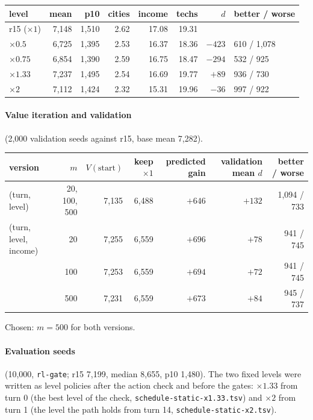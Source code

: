 \documentclass{../polyexp}
\begin{document}
\begin{center}\small
\begin{tabular}{lrrrrrrl}
\toprule
level & mean & p10 & cities & income & techs & $d$ & better / worse \\
\midrule
r15 ($\times1$) & 7{,}148 & 1{,}510 & 2.62 & 17.08 & 19.31 &        & \\
$\times0.5$     & 6{,}725 & 1{,}395 & 2.53 & 16.37 & 18.36 & $-423$ & 610 / 1{,}078 \\
$\times0.75$    & 6{,}854 & 1{,}390 & 2.59 & 16.75 & 18.47 & $-294$ & 532 / 925 \\
$\times1.33$    & 7{,}237 & 1{,}495 & 2.54 & 16.69 & 19.77 & $+89$  & 936 / 730 \\
$\times2$       & 7{,}112 & 1{,}424 & 2.32 & 15.31 & 19.96 & $-36$  & 997 / 922 \\
\bottomrule
\end{tabular}
\end{center}

\paragraph{Value iteration and validation} (2{,}000 validation seeds against r15, base mean 7{,}282).

\begin{center}\small
\begin{tabular}{lrrrrrr}
\toprule
version & $m$ & $V(\text{start})$ & keep $\times1$ & predicted gain & validation mean $d$ & better / worse \\
\midrule
(turn, level)          & 20, 100, 500 & 7{,}135 & 6{,}488 & $+646$ & $+132$ & 1{,}094 / 733 \\
(turn, level, income)  & 20           & 7{,}255 & 6{,}559 & $+696$ & $+78$  & 941 / 745 \\
                       & 100          & 7{,}253 & 6{,}559 & $+694$ & $+72$  & 941 / 745 \\
                       & 500          & 7{,}231 & 6{,}559 & $+673$ & $+84$  & 945 / 737 \\
\bottomrule
\end{tabular}
\end{center}

Chosen: $m = 500$ for both versions.

\paragraph{Evaluation seeds} (10{,}000, \texttt{rl-gate}; r15 7{,}199, median 8{,}655, p10 1{,}480). The two fixed
levels were written as level policies after the action check and before the gates: $\times1.33$ from turn 0 (the
best level of the check, \texttt{schedule-static-x1.33.tsv}) and $\times2$ from turn 1 (the level the path holds from
turn 14, \texttt{schedule-static-x2.tsv}).
\end{document}
